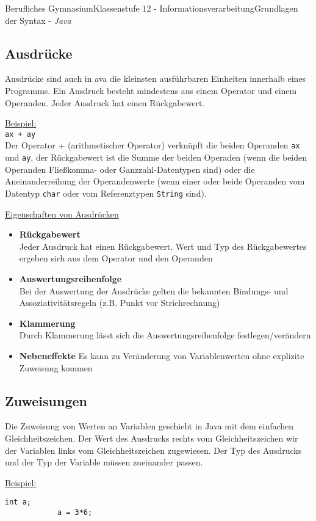 \documentclass[11pt,oneside,openany,headings=optiontotoc,11pt,numbers=noenddot]{article}
\begin{document}
\begin{worksheet}{Berufliches Gymnasium}{Klassenstufe 12 - Informationsverarbeitung}{Grundlagen der Syntax - \textit{Java}}
		\subsection{Ausdrücke}
		Ausdrücke sind auch in ava die kleinsten ausführbaren Einheiten innerhalb eines Programms. Ein Ausdruck besteht mindestens aus einem Operator und einem Operanden. Jeder Ausdruck hat einen Rückgabewert.\\
		\par\noindent
		\underline{Beispiel:}\\
		\lstinline[style=JavaInputStyle]|ax + ay|\\
		Der Operator + (arithmetischer Operator) verknüpft die beiden Operanden \lstinline[style=JavaInputStyle]|ax| und \lstinline[style=JavaInputStyle]|ay|, der Rückgabewert ist die Summe der beiden Operaden (wenn die beiden Operanden Fließkomma- oder Ganzzahl-Datentypen sind) oder die Aneinanderreihung der Operandenwerte (wenn einer oder beide Operanden vom Datentyp \lstinline[style=JavaInputStyle]|char| oder vom Referenztypen \lstinline[style=JavaInputStyle]|String| sind).\\
		\par\noindent
		\underline{Eigenschaften von Ausdrücken}
		\begin{itemize}
			\item \textbf{Rückgabewert}\\
			Jeder Ausdruck hat einen Rückgabewert. Wert und Typ des Rückgabewertes ergeben sich aus dem Operator und den Operanden
			\item \textbf{Auswertungsreihenfolge}\\
			Bei der Auswertung der Ausdrücke gelten die bekannten Bindungs- und Assoziativitätsregeln (z.B. \grqq{}Punkt vor Strichrechnung\grqq{})
			\item \textbf{Klammerung}\\
			Durch Klammerung lässt sich die Auswertungsreihenfolge festlegen/verändern
			\item \textbf{Nebeneffekte}
			Es kann zu Veränderung von Variablenwerten ohne explizite Zuweisung kommen
		\end{itemize}
		\subsection{Zuweisungen}
		Die Zuweisung von Werten an Variablen geschieht in Java mit dem einfachen Gleichheitszeichen. Der Wert des Ausdrucks rechts vom Gleichheitszeichen wir der Variablen links vom Gleichheitszeichen zugewiesen. Der Typ des Ausdrucks und der Typ der Variable müssen zueinander passen.\\
		\par\noindent
		\underline{Beispiel:}
		\begin{lstlisting}[style=JavaInputStyle]
			int a;
			a = 3*6;
		\end{lstlisting}

\end{worksheet}
\end{document}
